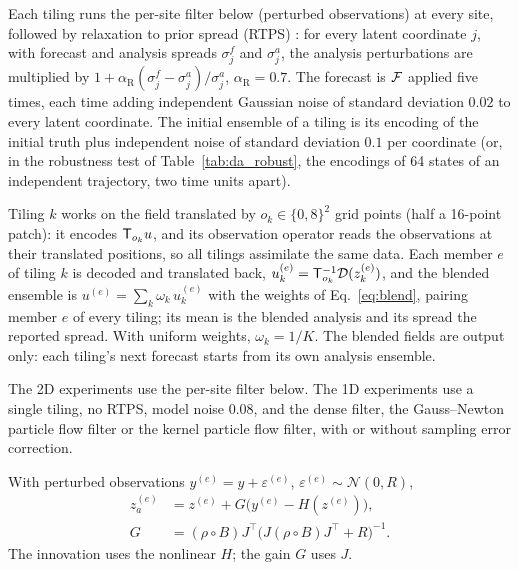  Each tiling runs the per-site filter below (perturbed observations) at every site,
followed by relaxation to prior spread (RTPS) \citep{whitakerhamill2012}: for every latent coordinate $j$,
with forecast and analysis spreads $\sigma^f_j$ and $\sigma^a_j$, the analysis perturbations are
multiplied by $1+\alpha_{\mathrm R}(\sigma^f_j-\sigma^a_j)/\sigma^a_j$, $\alpha_{\mathrm R}=0.7$. The forecast is $\mathcal{F}$ applied
five times, each time adding independent Gaussian noise of standard deviation $0.02$ to every latent
coordinate. The initial ensemble of a tiling is its encoding of the initial truth plus independent
noise of standard deviation $0.1$ per coordinate (or, in the robustness test of
Table~\ref{tab:da_robust}, the encodings of 64 states of an independent trajectory, two time units
apart).

 Tiling $k$ works on the field translated by $o_k\in\{0,8\}^2$ grid points
(half a 16-point patch): it encodes $\mathsf{T}_{o_k}u$, and its observation operator reads the observations
at their translated positions, so all tilings assimilate the same data. Each member $e$ of tiling $k$
is decoded and translated back, $u^{(e)}_k=\mathsf{T}_{o_k}^{-1}\mathcal{D}(z^{(e)}_k)$, and the blended ensemble is
$u^{(e)}=\sum_k \omega_k\,u^{(e)}_k$ with the weights of Eq.~\eqref{eq:blend}, pairing member $e$ of every
tiling; its mean is the blended analysis and its spread the reported spread. With uniform weights,
$\omega_k=1/K$. The blended fields are output only: each tiling's next forecast starts from its own
analysis ensemble.

 The 2D experiments use the per-site filter below. The 1D experiments use
a single tiling, no RTPS, model noise $0.08$, and the dense filter, the Gauss--Newton particle flow filter or the kernel particle flow filter,
with or without sampling error correction.

 With perturbed observations
$y^{(e)}=y+\varepsilon^{(e)}$, $\varepsilon^{(e)}\sim\mathcal N(0,R)$,
\begin{equation}
\begin{aligned}
  z_a^{(e)} &= z^{(e)} + G\big(y^{(e)}-H(z^{(e)})\big),\\
  G &= (\rho\circ B)J^\top\big(J(\rho\circ B)J^\top+R\big)^{-1}.
\end{aligned}
\end{equation}
The innovation uses the nonlinear $H$; the gain $G$ uses $J$.

